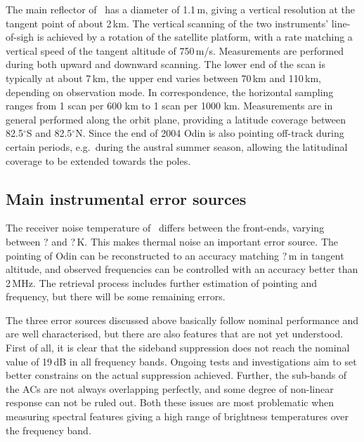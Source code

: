 The main reflector of \smr\ has a diameter of 1.1\,m, giving a
vertical resolution at the tangent point of about 2\,km. The vertical scanning
of the two instruments' line-of-sigh is achieved by a rotation of the satellite
platform, with a rate matching a vertical speed of the tangent altitude of
750\,m/s. Measurements are performed during both upward and downward scanning.
The lower end of the scan is typically at about 7\,km, the upper end varies
between 70\,km and 110\,km, depending on observation mode. In correspondence,
the horizontal sampling ranges from 1 scan per 600 km to 1 scan per 1000 km.
Measurements are in general performed along the orbit plane, providing a
latitude coverage between 82.5$^{\circ}$S and 82.5$^{\circ}$N. Since the end of
2004 Odin is also pointing off-track during certain periods, e.g.\ during the
austral summer season, allowing the latitudinal coverage to be extended towards
the poles. 


\subsection{Main instrumental error sources}
%
The receiver noise temperature of \smr\ differs between the front-ends, varying
between ? and ?\,K. This makes thermal noise an important
error source. The pointing of Odin can be reconstructed to an accuracy matching
?\,m in tangent altitude, and observed frequencies can be controlled with an
accuracy better than 2\,MHz. The retrieval process includes further estimation
of pointing and frequency, but there will be some remaining errors.

The three error sources discussed above basically follow nominal performance
and are well characterised, but there are also features that are not yet
understood. First of all, it is clear that the sideband suppression does not
reach the nominal value of 19\,dB in all frequency bands. Ongoing tests and
investigations aim to set better constrains on the actual suppression achieved.
Further, the sub-bands of the ACs are not always overlapping perfectly, and
some degree of non-linear response can not be ruled out. Both these issues are
most problematic when measuring spectral features giving a high range of
brightness temperatures over the frequency band.

